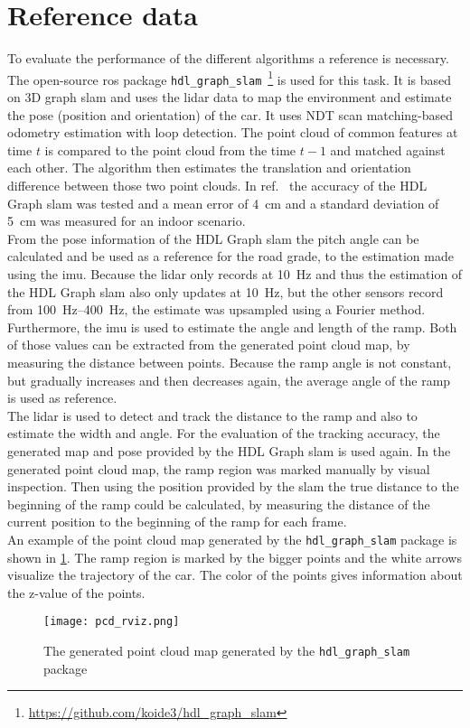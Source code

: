 \section{Reference data}
To evaluate the performance of the different algorithms a reference is necessary.
The open-source \gls{ros} package \texttt{hdl\_graph\_slam}~\footnote{\url{https://github.com/koide3/hdl_graph_slam}} is used for this task.
It is based on 3D graph \gls{slam} and uses the \gls{lidar} data to map the environment and estimate the pose (position and orientation) of the car.
It uses NDT scan matching-based odometry estimation with loop detection.
The point cloud of common features at time $t$ is compared to the point cloud from the time $t-1$ and matched against each other.
The algorithm then estimates the translation and orientation difference between those two point clouds.
In ref.~\cite{Akpnar2021} the accuracy of the HDL Graph \gls{slam} was tested and a mean error of \SI{4}{\cm} and a standard deviation of \SI{5}{\cm} was measured for an indoor scenario.\\
From the pose information of the HDL Graph \gls{slam} the pitch angle can be calculated and be used as a reference for the road grade, to the estimation made using the \gls{imu}.
Because the \gls{lidar} only records at \SI{10}{\hertz} and thus the estimation of the HDL Graph \gls{slam} also only updates at \SI{10}{\hertz}, but the other sensors record from \SIrange{100}{400}{\hertz}, the estimate was upsampled using a Fourier method.
Furthermore, the \gls{imu} is used to estimate the angle and length of the ramp.
Both of those values can be extracted from the generated point cloud map, by measuring the distance between points.
Because the ramp angle is not constant, but gradually increases and then decreases again, the average angle of the ramp is used as reference.\\
The \gls{lidar} is used to detect and track the distance to the ramp and also to estimate the width and angle.
For the evaluation of the tracking accuracy, the generated map and pose provided by the HDL Graph \gls{slam} is used again.
In the generated point cloud map, the ramp region was marked manually by visual inspection.
Then using the position provided by the \gls{slam} the true distance to the beginning of the ramp could be calculated, by measuring the distance of the current position to the beginning of the ramp for each frame.\\
An example of the point cloud map generated by the \texttt{hdl\_graph\_slam} package is shown in \cref{fig:pcd_rviz}.
The ramp region is marked by the bigger points and the white arrows visualize the trajectory of the car.
The color of the points gives information about the z-value of the points.
\begin{figure}[htbp]
	\centering
	\texttt{[image: pcd\_rviz.png]}
	\caption[Generated point cloud]{The generated point cloud map generated by the \texttt{hdl\_graph\_slam} package}
	\label{fig:pcd_rviz}
\end{figure}



